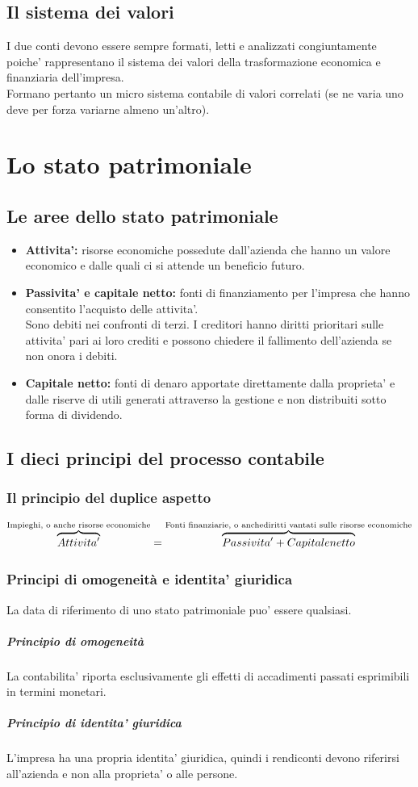 \documentclass{report}
\newcommand\hr{\par\vspace{-.5\ht\strutbox}\noindent\hrulefill\par}
\begin{document}
	\subsection{Il sistema dei valori}
	I due conti devono essere sempre formati, letti e analizzati congiuntamente poiche' rappresentano il sistema dei valori della trasformazione economica e finanziaria dell'impresa.
	\medskip \\Formano pertanto un micro sistema contabile di valori correlati (se ne varia uno deve per forza variarne almeno un'altro).
	\section{Lo stato patrimoniale}
	\subsection{Le aree dello stato patrimoniale}
	\begin{itemize}
		\item \textbf{Attivita':} risorse economiche possedute dall'azienda che hanno un valore economico e dalle quali ci si attende un beneficio futuro.
		\hr
		\item \textbf{Passivita' e capitale netto:} fonti di finanziamento per l'impresa che hanno consentito l'acquisto delle attivita'.
		\medskip \\Sono debiti nei confronti di terzi. I creditori hanno diritti prioritari sulle attivita' pari ai loro crediti e possono chiedere il fallimento dell'azienda se non onora i debiti.
		\item \textbf{Capitale netto:} fonti di denaro apportate direttamente dalla proprieta' e dalle riserve di utili generati attraverso la gestione e non distribuiti sotto forma di dividendo.
	\end{itemize}
	\subsection{I dieci principi del processo contabile}
	\subsubsection{Il principio del duplice aspetto}
	\[
	\overbrace{Attivita'}^\text{Impieghi, o anche risorse economiche} = \overbrace{Passivita' + Capitale netto}^\text{Fonti finanziarie, o anche\\diritti vantati sulle risorse economiche}
	\]
	\subsubsection{Principi di omogeneità e identita' giuridica}
	La data di riferimento di uno stato patrimoniale puo' essere qualsiasi.
	\subparagraph{Principio di omogeneità} La contabilita' riporta esclusivamente gli effetti di accadimenti passati esprimibili in termini monetari.
	\subparagraph{Principio di identita' giuridica} L'impresa ha una propria identita' giuridica, quindi i rendiconti devono riferirsi all'azienda e non alla proprieta' o alle persone.
\end{document}
